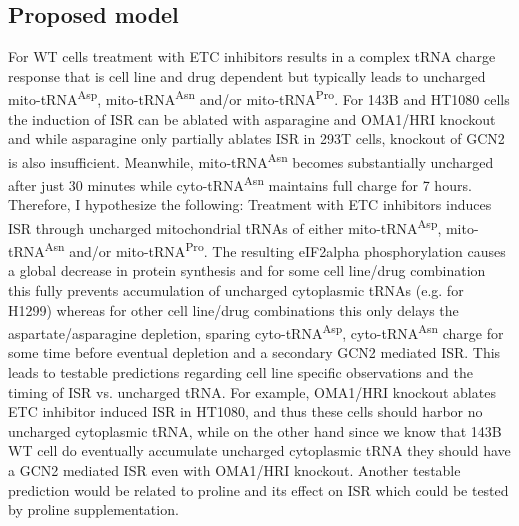 \subsection{Proposed model}
For WT cells treatment with ETC inhibitors results in a complex tRNA charge response that is cell line and drug dependent but typically leads to uncharged mito-tRNA\textsuperscript{Asp}, mito-tRNA\textsuperscript{Asn} and/or mito-tRNA\textsuperscript{Pro}.
For 143B and HT1080 cells the induction of ISR can be ablated with asparagine and OMA1/HRI knockout and while asparagine only partially ablates ISR in 293T cells, knockout of GCN2 is also insufficient.
Meanwhile, mito-tRNA\textsuperscript{Asn} becomes substantially uncharged after just 30 minutes while cyto-tRNA\textsuperscript{Asn} maintains full charge for 7 hours.
Therefore, I hypothesize the following:
Treatment with ETC inhibitors induces ISR through uncharged mitochondrial tRNAs of either mito-tRNA\textsuperscript{Asp}, mito-tRNA\textsuperscript{Asn} and/or mito-tRNA\textsuperscript{Pro}.
The resulting eIF2alpha phosphorylation causes a global decrease in protein synthesis and for some cell line/drug combination this fully prevents accumulation of uncharged cytoplasmic tRNAs (e.g. for H1299) whereas for other cell line/drug combinations this only delays the aspartate/asparagine depletion, sparing cyto-tRNA\textsuperscript{Asp}, cyto-tRNA\textsuperscript{Asn} charge for some time before eventual depletion and a secondary GCN2 mediated ISR.
This leads to testable predictions regarding cell line specific observations and the timing of ISR vs. uncharged tRNA.
For example, OMA1/HRI knockout ablates ETC inhibitor induced ISR in HT1080, and thus these cells should harbor no uncharged cytoplasmic tRNA, while on the other hand since we know that 143B WT cell do eventually accumulate uncharged cytoplasmic tRNA they should have a GCN2 mediated ISR even with OMA1/HRI knockout.
Another testable prediction would be related to proline and its effect on ISR which could be tested by proline supplementation.

